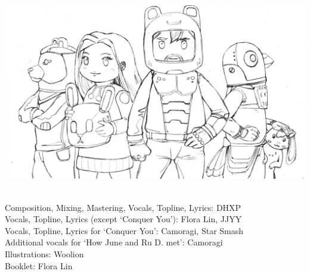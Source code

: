 \documentclass{article}
\begin{document}
\phantom{;}


\clearpage













\vspace*{\fill}
\includegraphics[width=.7\paperwidth]{Assets/cosmoose_cover_drawz}

\phantom{*}\\
Composition, Mixing, Mastering, Vocals, Topline, Lyrics: DHXP\\
Vocals, Topline, Lyrics (except `Conquer You'): Flora Lin, JJYY\\
Vocals, Topline, Lyrics for `Conquer You': Camoragi, Star Smash\\
Additional vocals for `How June and Ru D. met': Camoragi\\
Illustrations: Woolion\\
Booklet: Flora Lin
\end{document}
